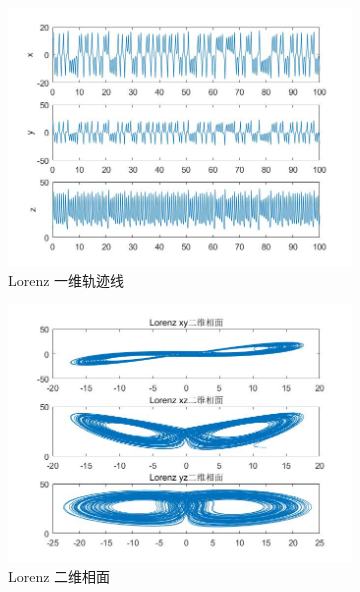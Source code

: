 	    \begin{figure}[H]
	        \centering
	        \begin{subfigure}[b]{0.4\textwidth}
	            \includegraphics[width=\textwidth]{images/Lorenzguijixian.jpg}
	            \caption{Lorenz 一维轨迹线}
	            \label{Lorenz 一维轨迹线}
	        \end{subfigure}
	        \begin{subfigure}[b]{0.4\textwidth}
	            \includegraphics[width=\textwidth]{images/Lorenz2xiangmian.jpg}
	            \caption{Lorenz 二维相面}
	            \label{Lorenz 二维相面}
	        \end{subfigure}
	        \begin{subfigure}[b]{0.4\textwidth}

\end{subfigure}
\end{figure}
